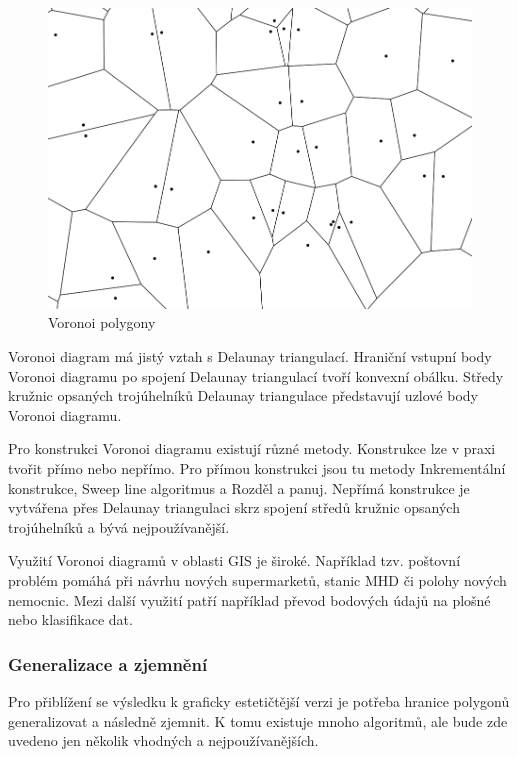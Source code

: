 \begin{figure}[H] \centering
    \includegraphics[width=400pt]{./pictures/voronoi.png}
    \caption[Voronoi polygony]{Voronoi polygony}
	\label{fig:voronoi}              
\end{figure}   

Voronoi diagram má jistý vztah s Delaunay triangulací. Hraniční vstupní body
Voronoi diagramu po spojení Delaunay triangulací tvoří konvexní obálku.
Středy kružnic opsaných trojúhelníků Delaunay triangulace představují uzlové body
Voronoi diagramu.

Pro konstrukci Voronoi diagramu existují různé metody. Konstrukce lze v praxi tvořit přímo nebo nepřímo.
Pro přímou konstrukci jsou tu metody Inkrementální konstrukce, Sweep line algoritmus a
Rozděl a panuj. Nepřímá konstrukce je vytvářena přes Delaunay triangulaci skrz spojení středů
kružnic opsaných trojúhelníků a bývá nejpoužívanější. 

Využití Voronoi diagramů v oblasti GIS je široké. Například tzv. poštovní problém
pomáhá při návrhu nových supermarketů, stanic MHD či polohy nových nemocnic.
Mezi další využití patří například převod bodových údajů na plošné
nebo klasifikace dat. \cite{bayer-voronoi}

\subsubsection{Generalizace a zjemnění}
\label{generalizace_zjemneni}

Pro přiblížení se výsledku k graficky estetičtější verzi je potřeba hranice polygonů
generalizovat a následně zjemnit. K tomu existuje mnoho algoritmů, ale bude zde uvedeno
jen několik vhodných a nejpoužívanějších.

